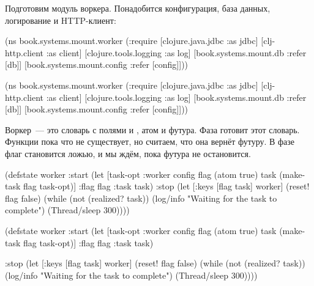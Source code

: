 Подготовим модуль воркера. Понадобится конфигурация, база данных, логирование и
HTTP-клиент:

\ifnarrow

\begin{clojure}
(ns book.systems.mount.worker
  (:require
   [clojure.java.jdbc :as jdbc]
   [clj-http.client :as client]
   [clojure.tools.logging :as log]
   [book.systems.mount.db :refer [db]]
   [book.systems.mount.config
     :refer [config]]))
\end{clojure}

\else

\begin{clojure}
(ns book.systems.mount.worker
  (:require
   [clojure.java.jdbc :as jdbc]
   [clj-http.client :as client]
   [clojure.tools.logging :as log]
   [book.systems.mount.db :refer [db]]
   [book.systems.mount.config :refer [config]]))
\end{clojure}

\fi

Воркер~--- это словарь с полями  и , атом и футура. Фаза
 готовит этот словарь. Функции  пока что не
существует, но считаем, что она вернёт футуру. В фазе  флаг
становится ложью, и мы ждём, пока футура не остановится.


\ifnarrow

\begin{clojure}
(defstate worker
  :start
  (let [{task-opt :worker} config
        flag (atom true)
        task (make-task flag task-opt)]
    {:flag flag :task task})
  :stop
  (let [{:keys [flag task]} worker]
    (reset! flag false)
    (while (not (realized? task))
      (log/info
      "Waiting for the task
                to complete")
      (Thread/sleep 300))))
\end{clojure}

\else

\ifafive

\begin{clojure}
(defstate worker
  :start
  (let [{task-opt :worker} config
        flag (atom true)
        task (make-task flag task-opt)]
    {:flag flag :task task})
\end{clojure}

\pagebreak

\begin{clojure}
  :stop
  (let [{:keys [flag task]} worker]
    (reset! flag false)
    (while (not (realized? task))
      (log/info "Waiting for the task to complete")
      (Thread/sleep 300))))
\end{clojure}

